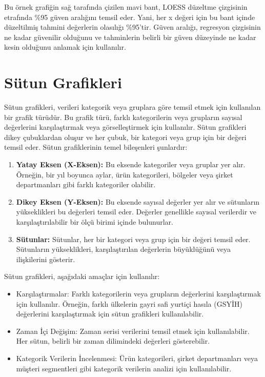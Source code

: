 \documentclass[
  letterpaper,
  DIV=11,
  numbers=noendperiod]{scrreprt}
\begin{document}
Bu örnek grafiğin sağ tarafında çizilen mavi bant, LOESS düzeltme
çizgisinin etrafında \%95 güven aralığını temsil eder. Yani, her x
değeri için bu bant içinde düzeltilmiş tahmini değerlerin olasılığı
\%95'tir. Güven aralığı, regresyon çizgisinin ne kadar güvenilir
olduğunu ve tahminlerin belirli bir güven düzeyinde ne kadar kesin
olduğunu anlamak için kullanılır.

\section*{Sütun Grafikleri}\label{suxfctun-grafikleri}


Sütun grafikleri, verileri kategorik veya gruplara göre temsil etmek
için kullanılan bir grafik türüdür. Bu grafik türü, farklı kategorilerin
veya grupların sayısal değerlerini karşılaştırmak veya görselleştirmek
için kullanılır. Sütun grafikleri dikey çubuklardan oluşur ve her çubuk,
bir kategori veya grup için bir değeri temsil eder. Sütun grafiklerinin
temel bileşenleri şunlardır:

\begin{enumerate}
\def\labelenumi{\arabic{enumi}.}
\item
  \textbf{Yatay Eksen (X-Eksen):} Bu eksende kategoriler veya gruplar
  yer alır. Örneğin, bir yıl boyunca aylar, ürün kategorileri, bölgeler
  veya şirket departmanları gibi farklı kategoriler olabilir.
\item
  \textbf{Dikey Eksen (Y-Eksen):} Bu eksende sayısal değerler yer alır
  ve sütunların yükseklikleri bu değerleri temsil eder. Değerler
  genellikle sayısal verilerdir ve karşılaştırılabilir bir ölçü birimi
  içinde bulunurlar.
\item
  \textbf{Sütunlar:} Sütunlar, her bir kategori veya grup için bir
  değeri temsil eder. Sütunların yükseklikleri, karşılaştırılan
  değerlerin büyüklüğünü veya ilişkilerini gösterir.
\end{enumerate}

Sütun grafikleri, aşağıdaki amaçlar için kullanılır:

\begin{itemize}
\item
  Karşılaştırmalar: Farklı kategorilerin veya grupların değerlerini
  karşılaştırmak için kullanılır. Örneğin, farklı ülkelerin gayri safi
  yurtiçi hasıla (GSYİH) değerlerini karşılaştırmak için sütun
  grafikleri kullanılabilir.
\item
  Zaman İçi Değişim: Zaman serisi verilerini temsil etmek için
  kullanılabilir. Her sütun, belirli bir zaman dilimindeki değerleri
  gösterebilir.
\item
  Kategorik Verilerin İncelenmesi: Ürün kategorileri, şirket
  departmanları veya müşteri segmentleri gibi kategorik verilerin
  analizi için kullanılabilir.
\end{itemize}
\end{document}

